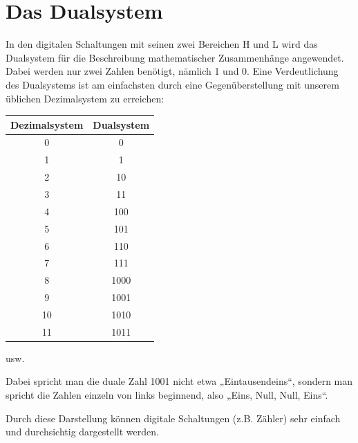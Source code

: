 \chapter{Das Dualsystem}

In den digitalen Schaltungen mit seinen zwei Bereichen H und L wird das Dualsystem für die Beschreibung mathematischer Zusammenhänge angewendet. Dabei werden nur zwei Zahlen benötigt, nämlich 1 und 0. Eine Verdeutlichung des Dualsystems ist am einfachsten durch eine Gegenüberstellung mit unserem üblichen Dezimalsystem zu erreichen:

\begin{table}[htbp]
  \centering
  \begin{tabular}{cc}
    \toprule
    \textbf{Dezimalsystem} & \textbf{Dualsystem} \\
    \midrule
     0 &  0 \\
     1 &  1 \\
     2 &  10 \\
     3 &  11 \\
     4 &  100 \\
     5 &  101 \\
     6 &  110 \\
     7 &  111 \\
     8 &  1000 \\
     9 &  1001 \\
     10 &  1010 \\
     11 &  1011 \\
    \bottomrule
  \end{tabular}
  \par\medskip usw.
\end{table}

Dabei spricht man die duale Zahl 1001 nicht etwa „Eintausendeins“, sondern man spricht die Zahlen einzeln von links beginnend, also „Eins, Null, Null, Eins“.

Durch diese Darstellung können digitale Schaltungen (z.B. Zähler) sehr einfach und durchsichtig dargestellt werden.

